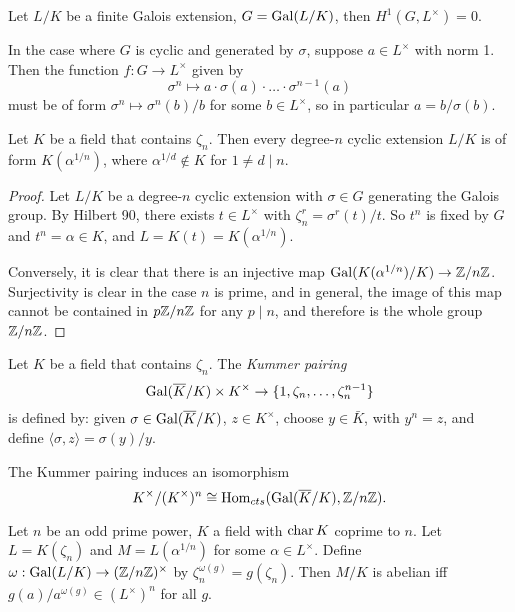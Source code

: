 \documentclass[11pt]{amsart}
\begin{document}
\begin{thm}
    Let $L/K$ be a finite Galois extension, $G = \operatorname{Gal}(L/K)$, then $H^1(G, L^{\times}) = 0$.
\end{thm}

In the case where $G$ is cyclic and generated by $\sigma$, suppose $a\in L^{\times}$ with norm 1. Then the function $f: G\to L^{\times}$ given by
\[\sigma^n \mapsto a\cdot \sigma(a)\cdot\dots \cdot \sigma^{n-1}(a)\]
must be of form $\sigma^n \mapsto \sigma^n(b)/b$ for some $b\in L^{\times}$, so in particular $a = b/\sigma(b)$. 

\begin{thm}
    Let $K$ be a field that contains $\zeta_n$. Then every degree-$n$ cyclic extension $L/K$ is of form $K(\alpha^{1/n})$, where $\alpha^{1/d}\notin K$ for $1\neq d\mid n$.
\end{thm}

\begin{proof}
    Let $L/K$ be a degree-$n$ cyclic extension with $\sigma \in G$ generating the Galois group. By Hilbert 90, there exists $t\in L^{\times}$ with $\zeta_n^r = \sigma^r(t)/t$. So $t^n$ is fixed by $G$ and $t^n = \alpha \in K$, and $L = K(t) = K(\alpha^{1/n})$.

    Conversely, it is clear that there is an injective map $\operatorname{Gal}(K(\alpha^{1/n})/K)\to \mathbb{Z}/n\mathbb{Z}$. Surjectivity is clear in the case $n$ is prime, and in general, the image of this map cannot be contained in $p\mathbb{Z}/n\mathbb{Z}$ for any $p\mid n$, and therefore is the whole group $\mathbb{Z}/n\mathbb{Z}$.
\end{proof}

\begin{defn}
    Let $K$ be a field that contains $\zeta_n$. The \emph{Kummer pairing} 
    \[\operatorname{Gal}(\overline{K}/K) \times K^{\times} \to \{1,\zeta_n,\dots,\zeta_n^{n-1}\}\] 
    is defined by: given $\sigma\in\operatorname{Gal}(\overline{K}/K)$, $z\in K^{\times}$, choose $y\in \bar{K}$, with $y^n = z$, and define $\langle\sigma, z\rangle = \sigma(y)/y$.
\end{defn}

\begin{thm}
    The Kummer pairing induces an isomorphism
    \[K^{\times}/(K^{\times})^n \cong \operatorname{Hom}_{cts}(\operatorname{Gal}(\overline{K}/K), \mathbb{Z}/n\mathbb{Z}).\]
\end{thm}

\begin{prop}
    Let $n$ be an odd prime power, $K$ a field with $\operatorname{char} K$ coprime to $n$. Let $L = K(\zeta_n)$ and $M = L(\alpha^{1/n})$ for some $\alpha\in L^{\times}$. Define $\omega: \operatorname{Gal}(L/K)\to (\mathbb{Z}/n\mathbb{Z})^{\times}$ by $\zeta_n^{\omega(g)} = g(\zeta_n)$. Then $M/K$ is abelian iff $g(a)/a^{\omega(g)} \in (L^{\times})^n$ for all $g$.
\end{prop}
\end{document}
